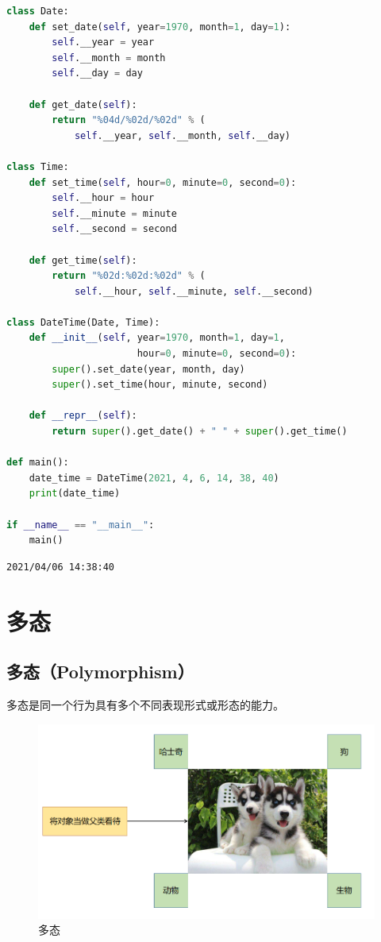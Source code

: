 
\begin{lstlisting}[language=Python]
class Date:
    def set_date(self, year=1970, month=1, day=1):
        self.__year = year
        self.__month = month
        self.__day = day
    
    def get_date(self):
        return "%04d/%02d/%02d" % (
            self.__year, self.__month, self.__day)
    
class Time:
    def set_time(self, hour=0, minute=0, second=0):
        self.__hour = hour
        self.__minute = minute
        self.__second = second
    
    def get_time(self):
        return "%02d:%02d:%02d" % (
            self.__hour, self.__minute, self.__second)

class DateTime(Date, Time):
    def __init__(self, year=1970, month=1, day=1, 
                       hour=0, minute=0, second=0):
        super().set_date(year, month, day)
        super().set_time(hour, minute, second)
    
    def __repr__(self):
        return super().get_date() + " " + super().get_time()

def main():
    date_time = DateTime(2021, 4, 6, 14, 38, 40)
    print(date_time)

if __name__ == "__main__":
    main()
\end{lstlisting}

\begin{tcolorbox}
	\begin{verbatim}
2021/04/06 14:38:40
\end{verbatim}
\end{tcolorbox}

\newpage

\section{多态}

\subsection{多态（Polymorphism）}

多态是同一个行为具有多个不同表现形式或形态的能力。

\begin{figure}[H]
	\centering
	\includegraphics[scale=0.7]{img/C7/7-6/1.png}
	\caption{多态}
\end{figure}

